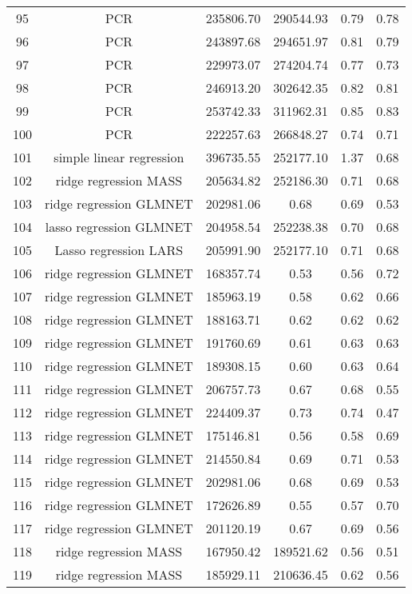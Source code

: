 \begin{tabular}{cccccc}
  95 & PCR & 235806.70 & 290544.93 & 0.79 & 0.78 \\ 
  96 & PCR & 243897.68 & 294651.97 & 0.81 & 0.79 \\ 
  97 & PCR & 229973.07 & 274204.74 & 0.77 & 0.73 \\ 
  98 & PCR & 246913.20 & 302642.35 & 0.82 & 0.81 \\ 
  99 & PCR & 253742.33 & 311962.31 & 0.85 & 0.83 \\ 
  100 & PCR & 222257.63 & 266848.27 & 0.74 & 0.71 \\ 
  101 & simple linear regression & 396735.55 & 252177.10 & 1.37 & 0.68 \\ 
  102 & ridge regression MASS & 205634.82 & 252186.30 & 0.71 & 0.68 \\ 
  103 & ridge regression GLMNET & 202981.06 & 0.68 & 0.69 & 0.53 \\ 
  104 & lasso regression GLMNET & 204958.54 & 252238.38 & 0.70 & 0.68 \\ 
  105 & Lasso regression LARS & 205991.90 & 252177.10 & 0.71 & 0.68 \\ 
  106 & ridge regression GLMNET & 168357.74 & 0.53 & 0.56 & 0.72 \\ 
  107 & ridge regression GLMNET & 185963.19 & 0.58 & 0.62 & 0.66 \\ 
  108 & ridge regression GLMNET & 188163.71 & 0.62 & 0.62 & 0.62 \\ 
  109 & ridge regression GLMNET & 191760.69 & 0.61 & 0.63 & 0.63 \\ 
  110 & ridge regression GLMNET & 189308.15 & 0.60 & 0.63 & 0.64 \\ 
  111 & ridge regression GLMNET & 206757.73 & 0.67 & 0.68 & 0.55 \\ 
  112 & ridge regression GLMNET & 224409.37 & 0.73 & 0.74 & 0.47 \\ 
  113 & ridge regression GLMNET & 175146.81 & 0.56 & 0.58 & 0.69 \\ 
  114 & ridge regression GLMNET & 214550.84 & 0.69 & 0.71 & 0.53 \\ 
  115 & ridge regression GLMNET & 202981.06 & 0.68 & 0.69 & 0.53 \\ 
  116 & ridge regression GLMNET & 172626.89 & 0.55 & 0.57 & 0.70 \\ 
  117 & ridge regression GLMNET & 201120.19 & 0.67 & 0.69 & 0.56 \\ 
  118 & ridge regression MASS & 167950.42 & 189521.62 & 0.56 & 0.51 \\ 
  119 & ridge regression MASS & 185929.11 & 210636.45 & 0.62 & 0.56 \\ 

\end{tabular}
